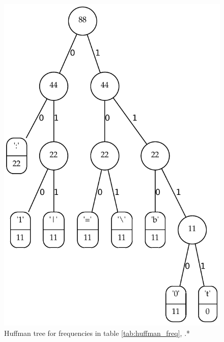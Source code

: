 \begin{figure}
  \centering 
  \includegraphics{optimizations/huffman2.pdf}
  \caption{Huffman tree for frequencies in table
    \ref{tab:huffman_freq}, \textsf{.*}}
  \label{fig:huffman1}
\end{figure}

